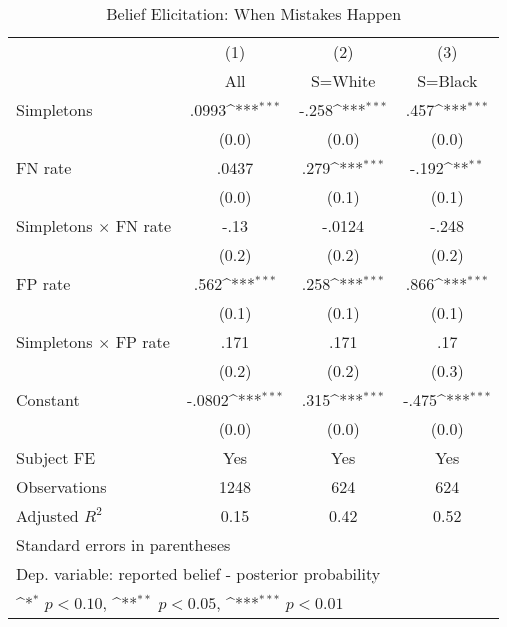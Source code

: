 \begin{table}[htbp]\centering
\def\sym#1{\ifmmode^{#1}\else\(^{#1}\)\fi}
\caption{Belief Elicitation: When Mistakes Happen}
\begin{tabular}{l*{3}{c}}
\hline\hline
                &\multicolumn{1}{c}{(1)}&\multicolumn{1}{c}{(2)}&\multicolumn{1}{c}{(3)}\\
                &\multicolumn{1}{c}{All}&\multicolumn{1}{c}{S=White}&\multicolumn{1}{c}{S=Black}\\
\hline
Simpletons      &    .0993\sym{***}&    -.258\sym{***}&     .457\sym{***}\\
                &    (0.0)         &    (0.0)         &    (0.0)         \\
FN rate         &    .0437         &     .279\sym{***}&    -.192\sym{**} \\
                &    (0.0)         &    (0.1)         &    (0.1)         \\
Simpletons $\times$ FN rate&     -.13         &   -.0124         &    -.248         \\
                &    (0.2)         &    (0.2)         &    (0.2)         \\
FP rate         &     .562\sym{***}&     .258\sym{***}&     .866\sym{***}\\
                &    (0.1)         &    (0.1)         &    (0.1)         \\
Simpletons $\times$ FP rate&     .171         &     .171         &      .17         \\
                &    (0.2)         &    (0.2)         &    (0.3)         \\
Constant        &   -.0802\sym{***}&     .315\sym{***}&    -.475\sym{***}\\
                &    (0.0)         &    (0.0)         &    (0.0)         \\
Subject FE      &      Yes         &      Yes         &      Yes         \\
\hline
Observations    &     1248         &      624         &      624         \\
Adjusted \(R^{2}\)&     0.15         &     0.42         &     0.52         \\
\hline\hline
\multicolumn{4}{l}{\footnotesize Standard errors in parentheses}\\
\multicolumn{4}{l}{\footnotesize Dep. variable: reported belief - posterior probability}\\
\multicolumn{4}{l}{\footnotesize \sym{*} \(p<0.10\), \sym{**} \(p<0.05\), \sym{***} \(p<0.01\)}\\
\end{tabular}
\end{table}
